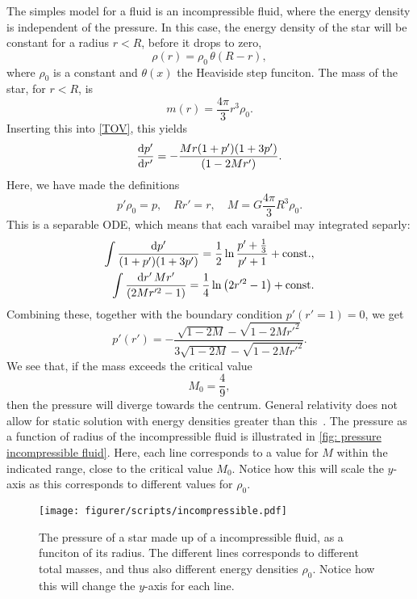 The simples model for a fluid is an incompressible fluid, where the energy density is independent of the pressure.
In this case, the energy density of the star will be constant for a radius $r < R$, before it drops to zero,
%
\begin{equation}
    \rho(r) = \rho_0 \, \theta (R - r),
\end{equation}
%
where $\rho_0$ is a constant and $\theta(x)$ the Heaviside step funciton.
The mass of the star, for $r < R$, is
%
\begin{equation}
    m(r) = \frac{4 \pi }{3} r^3 \rho_0.
\end{equation}
%
Inserting this into \autoref{TOV}, this yields
%
\begin{equation} 
    \diff{p'}{r'} = - \frac{M r (1 + p')(1 + 3 p')}{(1 - 2 M r')}.
\end{equation}
%
Here, we have made the definitions
%
\begin{equation}
    p' \rho_0 = p, \quad R r' = r, \quad
    M = G \frac{4 \pi}{3} R^3 \rho_0.
\end{equation}
%
This is a separable ODE, which means that each varaibel may integrated separly:
%
\begin{align}
    \int \frac{\text{d} p'}{(1 + p')(1 + 3p')} 
    = \frac{1}{2} \ln \frac{p' + \frac{1}{3}}{p' + 1} + \mathrm{const.} , \\
    \int \frac{\text{d} r' \, M r'}{(2 M r'^2 - 1)} = \frac{1}{4}\ln\left(2 r'^2 - 1 \right) + \mathrm{const.}
\end{align}
%
Combining these, together with the boundary condition $p'(r' = 1) = 0$, we get
%
\begin{equation}
    p'(r') = - \frac{\sqrt{1 - 2M} - \sqrt{1 -2Mr'^2}}{3 \sqrt{1 - 2M} - \sqrt{1 - 2M r'^2} }.
\end{equation}
%
We see that, if the mass exceeds the critical value
%
\begin{equation}
    M_0 = \frac{4}{9},
\end{equation}
then the pressure will diverge towards the centrum.
General relativity does not allow for static solution with energy densities greater than this~\autocite{carrollSpacetimeGeometryIntroduction2019}.
The pressure as a function of radius of the incompressible fluid is illustrated in \autoref{fig: pressure incompressible fluid}.
Here, each line corresponds to a value for $M$ within the indicated range, close to the critical value $M_0$.
Notice how this will scale the $y$-axis as this corresponds to different values for $\rho_0$.

\begin{figure}
    \centering
    \texttt{[image: figurer/scripts/incompressible.pdf]}
    \caption{The pressure of a star made up of a incompressible fluid, as a funciton of its radius. The different lines corresponds to different total masses, and thus also different energy densities $\rho_0$. Notice how this will change the $y$-axis for each line.}
    \label{fig: pressure incompressible fluid}
\end{figure}

